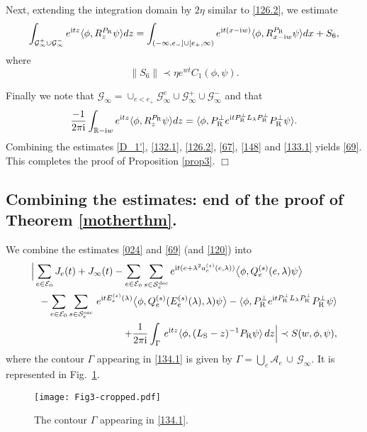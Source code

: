 \documentclass[letterpaper,onecolumn,11pt,accepted=2021-12-09]{quantumarticle}
\numberwithin{equation}{section}
\newcommand{\aes}{a_e^{(s)}}
\newcommand{\Qes}{Q_e^{(s)}}
\newcommand{\Ees}{E_e^{(s)}(\lambda)}
\renewcommand{\r}{{\rm R}}
\newcommand{\s}{{\rm S}}
\renewcommand{\i}{{\rm i}}
\def\qed{\hfill $\Box$\medskip}
\begin{document}
Next, extending the integration domain by $2\eta$ similar to \eqref{126.2},   we estimate
\begin{equation}
\int_{{\mathcal G}_\infty^+ \cup {\mathcal G}_\infty^-} e^{\i t z} \langle\phi, R_z^{P_\r}\psi\rangle dz = \int_{(-\infty,e_-]\cup [e_+,\infty)}   e^{\i t (x-\i w)} \langle\phi, R_{x-\i w}^{P_\r}\psi\rangle dx +S_6,
\label{133.1}
\end{equation}
where
\begin{equation}
\| S_6\| \prec \eta e^{wt} C_1(\phi,\psi). 
\end{equation}



\bigskip



Finally we note that ${\mathcal G}_\infty = \cup_{e<e_+} {\mathcal G}_\infty^e \cup {\mathcal G}_\infty^+ \cup{\mathcal G}_\infty^-$ and that
\begin{eqnarray}
\frac{-1}{2\pi\i} \int_{{\mathbb R}-\i w} e^{\i t z}\langle \phi, R_z^{P_\r} \psi\rangle dz =  \langle \phi, P^\perp_\r e^{\i t P^\perp_\r L_\lambda P^\perp_\r} P^\perp_\r \psi\rangle.
\label{120}
\end{eqnarray} 
Combining the estimates \eqref{D_1'},  \eqref{132.1}, \eqref{126.2},  \eqref{67}, \eqref{148}  and \eqref{133.1} yields \eqref{69}. This completes the proof of Proposition \ref{prop3}. \hfill \qed





\subsection{Combining the estimates: end of the proof of Theorem \ref{motherthm}. } 
\label{proofpropersect}

We combine the estimates \eqref{024} and \eqref{69}  (and \eqref{120}) into
\begin{eqnarray}
\lefteqn{
\Big| \sum_{e\in{\mathcal E}_0} J_e(t) +J_\infty(t) - 
\sum_{e\in{\mathcal E}_0}\sum_{s\in{\mathcal S}_e^{\rm dec}}e^{\i t (e+\lambda^2 \aes(e,\lambda))} \big\langle\phi, \Qes(e,\lambda)\psi\big\rangle}\nonumber\\ &&-\sum_{e\in{\mathcal E}_0}\sum_{s\in{\mathcal S}_e^{\rm osc}}  \, e^{\i t \Ees}\big\langle \phi, \Qes(\Ees,\lambda)\psi\big\rangle  -\langle \phi, P^\perp_\r e^{\i t P^\perp_\r L_\lambda P^\perp_\r} P^\perp_\r \psi\rangle \nonumber \\
&&+ \frac{1}{2\pi\i}  \int_{\Gamma}  \,  e^{\i t z} \langle\phi, (L_\s- z)^{-1}P_\r\psi\rangle  \, dz \Big|  \prec S(w,\phi,\psi),
\label{134.1}
\end{eqnarray}
where the contour $\Gamma$ appearing in \eqref{134.1} is given by $\Gamma =  \bigcup_e{\mathcal A}_e \, \cup\, {\mathcal G}_\infty$. It is represented in Fig.~\ref{Fig5}.
\begin{figure}[t]
	\centering
	\texttt{[image: Fig3-cropped.pdf]}
	\caption{The contour $\Gamma$ appearing in \eqref{134.1}.}
	\label{Fig5}
\end{figure}
\end{document}
